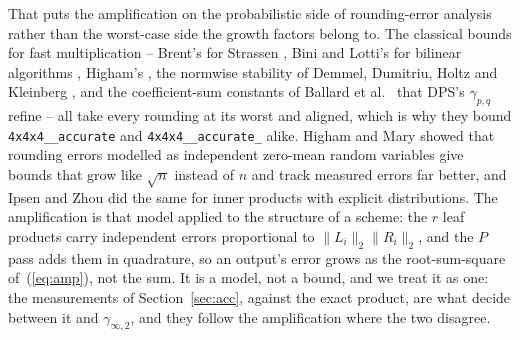 \documentclass[11pt]{article}
\theoremstyle{remark}
\newcommand{\ginf}{\gamma_{\infty,2}}
\newcommand{\acc}{\texttt{4x4x4\_\allowbreak 48\_\allowbreak accurate}\xspace}
\newcommand{\acct}{\texttt{4x4x4\_\allowbreak 48\_\allowbreak accurate\_\allowbreak 262}\xspace}
\begin{document}
That puts the amplification on the probabilistic side of rounding-error
analysis rather than the worst-case side the growth factors belong to.  The
classical bounds for fast multiplication -- Brent's for Strassen
\cite{Brent70}, Bini and Lotti's for bilinear algorithms \cite{BL80},
Higham's \cite{Higham02}, the normwise stability of Demmel, Dumitriu, Holtz
and Kleinberg \cite{DDHK07}, and the coefficient-sum constants of Ballard
et al.\ \cite{BBDLS16} that DPS's $\gamma_{p,q}$ refine -- all take every
rounding at its worst and aligned, which is why they bound \acc and \acct
alike.  Higham and Mary \cite{HM19} showed that rounding errors modelled as
independent zero-mean random variables give bounds that grow like $\sqrt n$
instead of $n$ and track measured errors far better, and Ipsen and Zhou
\cite{IZ20} did the same for inner products with explicit distributions.
The amplification is that model applied to the structure of a scheme: the
$r$ leaf products carry independent errors proportional to
$\lVert L_i\rVert_2\lVert R_i\rVert_2$, and the $P$ pass adds them in
quadrature, so an output's error grows as the root-sum-square
of~(\ref{eq:amp}), not the sum.  It is a model, not a bound, and we treat
it as one: the measurements of Section~\ref{sec:acc}, against the exact
product, are what decide between it and $\ginf$, and they follow the
amplification where the two disagree.
\end{document}
